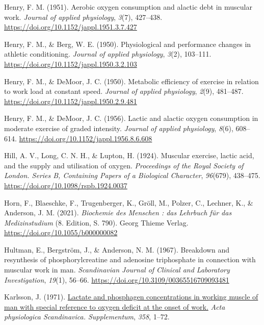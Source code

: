 \documentclass[
  letterpaper,
  DIV=11]{scrartcl}
\newlength{\cslhangindent}
\newenvironment{CSLReferences}[2] %
 {\begin{list}{}{%
  \setlength{\itemindent}{0pt}
  \setlength{\leftmargin}{0pt}
  \setlength{\parsep}{0pt}
  \ifodd #1
   \setlength{\leftmargin}{\cslhangindent}
   \setlength{\itemindent}{-1\cslhangindent}
  \fi
  \setlength{\itemsep}{#2\baselineskip}}}
 {\end{list}}
\begin{document}
\begin{CSLReferences}{1}{0}
Henry, F. M. (1951). {Aerobic oxygen consumption and alactic debt in
muscular work.} \emph{Journal of applied physiology}, \emph{3}(7),
427--438. \url{https://doi.org/10.1152/jappl.1951.3.7.427}

Henry, F. M., \& Berg, W. E. (1950). {Physiological and performance
changes in athletic conditioning.} \emph{Journal of applied physiology},
\emph{3}(2), 103--111. \url{https://doi.org/10.1152/jappl.1950.3.2.103}

Henry, F. M., \& DeMoor, J. C. (1950). {Metabolic efficiency of exercise
in relation to work load at constant speed.} \emph{Journal of applied
physiology}, \emph{2}(9), 481--487.
\url{https://doi.org/10.1152/jappl.1950.2.9.481}

Henry, F. M., \& DeMoor, J. C. (1956). {Lactic and alactic oxygen
consumption in moderate exercise of graded intensity}. \emph{Journal of
applied physiology}, \emph{8}(6), 608--614.
\url{https://doi.org/10.1152/jappl.1956.8.6.608}

Hill, A. V., Long, C. N. H., \& Lupton, H. (1924). {Muscular exercise,
lactic acid, and the supply and utilisation of oxygen}.
\emph{Proceedings of the Royal Society of London. Series B, Containing
Papers of a Biological Character}, \emph{96}(679), 438--475.
\url{https://doi.org/10.1098/rspb.1924.0037}

Horn, F., Blaeschke, F., Trugenberger, K., Gröll, M., Polzer, C.,
Lechner, K., \& Anderson, J. M. (2021). \emph{{Biochemie des Menschen :
das Lehrbuch f{ü}r das Medizinstudium}} (8. Edition, S. 790). Georg
Thieme Verlag. \url{https://doi.org/10.1055/b000000082}

Hultman, E., Bergström, J., \& Anderson, N. M. (1967). {Breakdown and
resynthesis of phosphorylcreatine and adenosine triphosphate in
connection with muscular work in man}. \emph{Scandinavian Journal of
Clinical and Laboratory Investigation}, \emph{19}(1), 56--66.
\url{https://doi.org/10.3109/00365516709093481}

Karlsson, J. (1971).
\href{https://www.ncbi.nlm.nih.gov/pubmed/5549478}{{Lactate and
phosphagen concentrations in working muscle of man with special
reference to oxygen deficit at the onset of work.}} \emph{Acta
physiologica Scandinavica. Supplementum}, \emph{358}, 1--72.


\end{CSLReferences}
\end{document}
